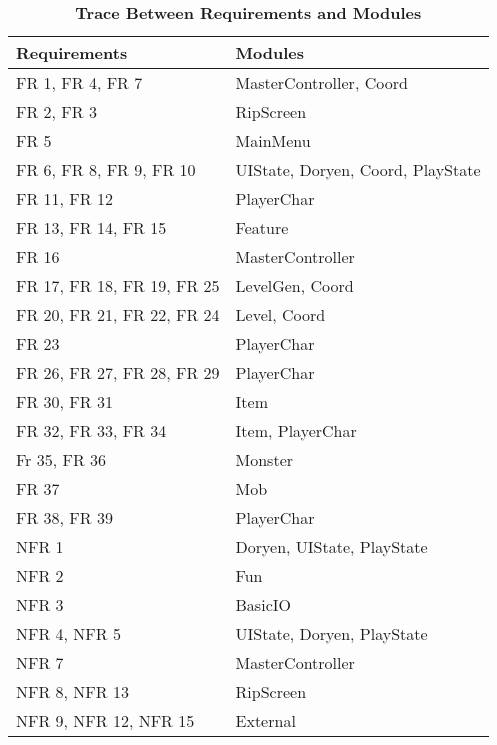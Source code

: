 \documentclass[12pt, titlepage]{article}
\begin{document}
    \begin{table}[H]
        \label{TblRT}
        \caption{\bf Trace Between Requirements and Modules}
        
        \def\arraystretch{1.1}
        \centering
        \bigskip
        \begin{tabular}{p{} p{}}

            \toprule
            \textbf{Requirements} & \textbf{Modules}\\
            \midrule

            FR 1, FR 4, FR 7 & MasterController, Coord\\
            FR 2, FR 3 & RipScreen\\
            FR 5 & MainMenu\\
            FR 6, FR 8, FR 9, FR 10 & UIState, Doryen, Coord, PlayState\\
            FR 11, FR 12 & PlayerChar\\
            FR 13, FR 14, FR 15 & Feature\\
            FR 16 & MasterController\\
            FR 17, FR 18, FR 19, FR 25 & LevelGen, Coord\\
            FR 20, FR 21, FR 22, FR 24 & Level, Coord\\
            FR 23 & PlayerChar\\
            FR 26, FR 27, FR 28, FR 29 & PlayerChar\\
            FR 30, FR 31 & Item\\
            FR 32, FR 33, FR 34 & Item, PlayerChar\\
            Fr 35, FR 36 & Monster\\
            FR 37 & Mob\\
            FR 38, FR 39 & PlayerChar\\
            \midrule
            NFR 1 & Doryen, UIState, PlayState\\
            NFR 2 & Fun\\
            NFR 3 & BasicIO\\
            NFR 4, NFR 5 & UIState, Doryen, PlayState\\
            NFR 7 & MasterController\\
            NFR 8, NFR 13 & RipScreen\\
            NFR 9, NFR 12, NFR 15 & External\\

            \bottomrule
        \end{tabular}
    \end{table}
\end{document}
